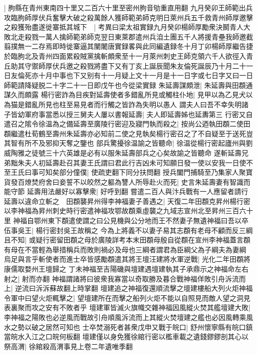 |{
	胊縣在青州東南四十里又二百六十里至密州朐音劬重直用翻}
九月癸卯王師範出兵攻臨朐師厚伏兵奮擊大破之殺萬餘人獲師範弟師克明日萊州兵五千救青州師厚邀擊之殺獲殆盡遂徙寨抵其城下　|{
	考異曰梁太祖實録九月癸卯楊師厚勵衆決鬭青人大敗北走殺戮一萬人擒師範弟師克翌日東萊郡遣州兵洎土團五千人將援青壘我師邀截翦撲無一二存焉即時徙寨逼其闉闍唐實録畧與此同編遺録冬十月丁卯楊師厚繼告捷於臨朐北及青州四面累殺賊黨擒斬頗衆至十一月萊州刺史王師克領六千人欲徑入青丘助其守禦師厚伏兵邀之殺戮將盡下又有丁亥上誕辰聞朱友倫死誕辰乃十月二十一日友倫死亦十月中事也下又别有十一月疑上文十一月是十一日字或七日字又曰一日師範請降疑脱二十字二十一日即戊午也今從梁實録}
朱延壽謀頗泄|{
	朱延壽與田頵通謀久而頗露}
楊行密詐為目疾對延壽使者多錯亂所見或觸柱仆地|{
	見甲以為乙見犬以為猫是錯亂所見也柱至易見者而行觸之皆詐為失明以愚人}
謂夫人曰吾不幸失明諸子皆幼軍府事當悉以授三舅夫人屢以書報延壽|{
	夫人即延壽姊也延夀第三}
行密又自遣召之隂令徐温為之備延壽至廣陵行密迎及寢門執而殺之|{
	按尚公迺執田頵二使田頵繼遣杜荀鶴至壽州朱延壽亦必知前二使之見執矣楊行密召之了不自疑至于送死豈其智有所不及邪抑天奪之鑒也}
部兵驚擾徐温諭之皆聽命|{
	徐温從楊行密起廬州與劉威陶雅之徒號三十六英雄是必有以服朱延壽部兵之心矣故諭之皆聽命}
遂斬延壽兄弟黜朱夫人初延壽赴召其妻王氏謂曰君此行吉凶未可知願日發一使以安我一日使不至王氏曰事可知矣部分僮僕|{
	使疏吏翻下同分扶問翻}
授兵闔門捕騎至乃集家人聚寶貨發百燎焚府舍曰妾誓不以皎然之軀為讐人所辱赴火而死|{
	史言朱延壽妻有智識而能守節}
延壽用法嚴好以寡擊衆|{
	好呼到翻}
嘗遣二百人與汴兵戰有一人應留者請行延壽以違命立斬之　田頵襲昇州得李神福妻子善遇之|{
	天復二年田頵克昇州楊行密以李神福為昇州刺史時行密遣神福攻鄂故頵乘虛襲之九域志宣州北至昇州三百六十里}
神福自鄂州東下頵遣使謂之曰公見機與公分地而王不然妻子無遺神福曰吾以卒伍事吳王|{
	楊行密封吳王故稱之}
今為上將義不以妻子易其志頵有老母不顧而反三綱且不知|{
	或疑行密留田頵之母於廣陵詳考本末田頵母殷自從頵在宣州李神福蓋言頵有母在不當輕為舉措稱兵而敗則禍必及母也三綱者謂君為臣綱父為子綱夫為妻綱}
烏足與言乎斬使者而進士卒皆感勵頵遣其將王壇汪建將水軍逆戰|{
	光化二年田頵將康儒取婺州王壇歸之}
丁未神福至吉陽磯與壇建遇壇建執其子承鼎示之神福命左右射之|{
	射而亦翻}
神福謂諸將曰彼衆我寡當以奇取勝及暮合戰神福佯敗引舟泝流而上|{
	逆流曰泝泝蘇故翻上時掌翻}
壇建追之神福復還順流擊之壇建樓船大列火炬神福令軍中曰望火炬輒擊之|{
	望壇建所在而擊之船列火炬不能以自照見而敵人望之洞見表裏聚而攻之安有不敗者乎}
壇建軍皆滅火旗幟交雜神福因風縱火焚其艦壇建大敗|{
	李神福之陽敗也必逆風而戰故引舟順風泝流而上其縱火焚壇建之艦也必因風轉乘風水之勢以破之居然可知也}
士卒焚溺死者甚衆戊申又戰于皖口|{
	舒州懷寧縣有皖口鎮當皖水入江之口皖何板翻}
壇建僅以身免獲徐綰行密以檻車載之遺錢鏐鏐剖其心以祭高渭|{
	徐綰殺高渭事見上卷二年遺唯季翻}
